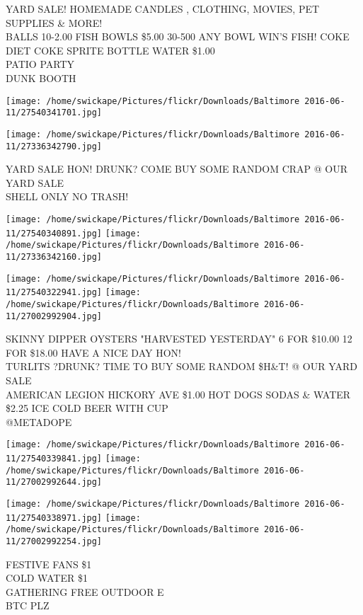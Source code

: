 \documentclass[10pt,letterpaper]{article}
\begin{document}
YARD SALE! HOMEMADE CANDLES , CLOTHING, MOVIES, PET SUPPLIES \& MORE!\\
BALLS 10{-}2.00 FISH BOWLS \$5.00 30{-}500 ANY BOWL WIN'S FISH!  COKE DIET COKE SPRITE BOTTLE WATER \$1.00\\
PATIO PARTY\\
DUNK BOOTH
\pagebreak

\texttt{[image: /home/swickape/Pictures/flickr/Downloads/Baltimore 2016-06-11/27540341701.jpg]}

\vspace{0.25in}
\texttt{[image: /home/swickape/Pictures/flickr/Downloads/Baltimore 2016-06-11/27336342790.jpg]}

YARD SALE HON!  DRUNK?  COME BUY SOME RANDOM CRAP @ OUR YARD SALE\\
SHELL ONLY NO TRASH!
\pagebreak

\texttt{[image: /home/swickape/Pictures/flickr/Downloads/Baltimore 2016-06-11/27540340891.jpg]}
\texttt{[image: /home/swickape/Pictures/flickr/Downloads/Baltimore 2016-06-11/27336342160.jpg]}

\texttt{[image: /home/swickape/Pictures/flickr/Downloads/Baltimore 2016-06-11/27540322941.jpg]}
\texttt{[image: /home/swickape/Pictures/flickr/Downloads/Baltimore 2016-06-11/27002992904.jpg]}

SKINNY DIPPER OYSTERS "HARVESTED YESTERDAY" 6 FOR \$10.00 12 FOR \$18.00 HAVE A NICE DAY HON!\\
TURLITS ?DRUNK? TIME TO BUY SOME RANDOM \$H\&T! @ OUR YARD SALE\\
AMERICAN LEGION HICKORY AVE \$1.00 HOT DOGS SODAS \& WATER \$2.25 ICE COLD BEER WITH CUP\\
@METADOPE
\pagebreak

\texttt{[image: /home/swickape/Pictures/flickr/Downloads/Baltimore 2016-06-11/27540339841.jpg]}
\texttt{[image: /home/swickape/Pictures/flickr/Downloads/Baltimore 2016-06-11/27002992644.jpg]}

\texttt{[image: /home/swickape/Pictures/flickr/Downloads/Baltimore 2016-06-11/27540338971.jpg]}
\texttt{[image: /home/swickape/Pictures/flickr/Downloads/Baltimore 2016-06-11/27002992254.jpg]}

FESTIVE FANS \$1\\
COLD WATER \$1\\
GATHERING FREE OUTDOOR E\\
BTC PLZ
\pagebreak
\end{document}
